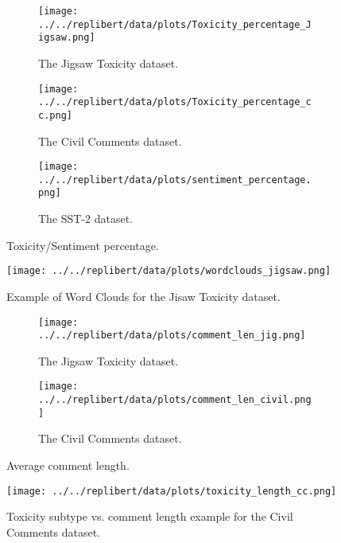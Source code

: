 \begin{figure}[h]
    \centering
    \begin{subfigure}{0.5\textwidth}
        \centering
        \texttt{[image: ../../replibert/data/plots/Toxicity\_percentage\_Jigsaw.png]} 
        \caption{The Jigsaw Toxicity dataset.}
        \label{fig:tox_percentage_jigsaw}
    \end{subfigure}%
    \hfill
    \begin{subfigure}{0.5\textwidth}
        \centering
        \texttt{[image: ../../replibert/data/plots/Toxicity\_percentage\_cc.png]} 
        \caption{The Civil Comments dataset.}
        \label{fig:tox_percentage_cc}
    \end{subfigure}

    \vspace{0.5cm} 
    \begin{subfigure}{0.5\textwidth}
        \centering
        \texttt{[image: ../../replibert/data/plots/sentiment\_percentage.png]} 
        \caption{The SST-2 dataset.}
        \label{fig:sentiment_percentage}
    \end{subfigure}
    \caption{Toxicity/Sentiment percentage.}
    \label{fig:tox_sentiment_percentage}
\end{figure}

\begin{figure}[h]
    \centering
    \texttt{[image: ../../replibert/data/plots/wordclouds\_jigsaw.png]}
    \caption{Example of Word Clouds for the Jisaw Toxicity dataset.}
    \label{fig:wordcloud_jigsaw}
\end{figure}


\begin{figure}[h]
    \centering
    \begin{subfigure}{0.49\textwidth}
        \centering
        \texttt{[image: ../../replibert/data/plots/comment\_len\_jig.png]}
        \caption{The Jigsaw Toxicity dataset.}
        \label{fig:comment_len_jigsaw}
    \end{subfigure}
    \hfill
    \begin{subfigure}{0.49\textwidth}
        \centering
        \texttt{[image: ../../replibert/data/plots/comment\_len\_civil.png]} 
        \caption{The Civil Comments dataset.}
        \label{fig:comment_len_cc}
    \end{subfigure}
    \caption{Average comment length.}
    \label{fig:comment_len_plots}
\end{figure}

\begin{figure}[h]
    \centering
    \texttt{[image: ../../replibert/data/plots/toxicity\_length\_cc.png]}
    \caption{Toxicity subtype vs. comment length example for the Civil Comments dataset.}
    \label{fig:tox_vs_len_cc}
\end{figure}